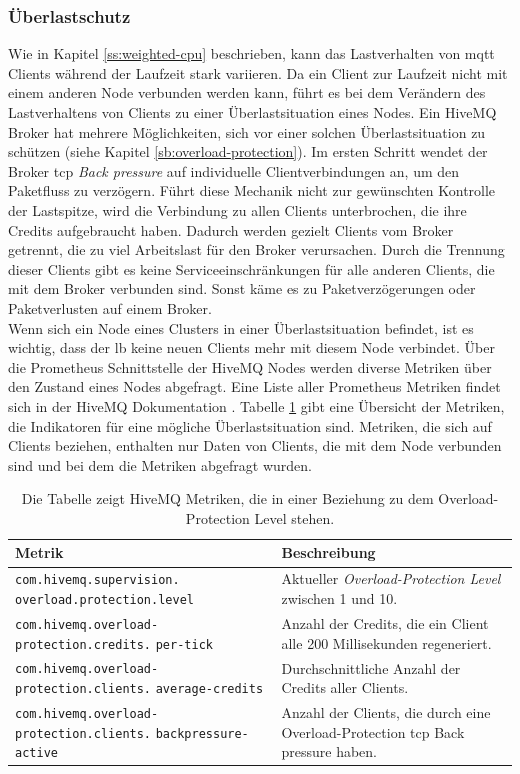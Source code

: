 \newpage
\null
\newpage
\subsubsection{Überlastschutz} \label{ss:circuit-breaking}
Wie in Kapitel \ref{ss:weighted-cpu} beschrieben, kann das Lastverhalten von \ac{mqtt} Clients während der Laufzeit stark variieren.
Da ein Client zur Laufzeit nicht mit einem anderen Node verbunden werden kann, führt es bei dem Verändern des Lastverhaltens von Clients zu einer Überlastsituation eines Nodes.
Ein HiveMQ Broker hat mehrere Möglichkeiten, sich vor einer solchen Überlastsituation zu schützen (siehe Kapitel \ref{sb:overload-protection}).
Im ersten Schritt wendet der Broker \ac{tcp} \textit{Back pressure} auf individuelle Clientverbindungen an, um den Paketfluss zu verzögern.
Führt diese Mechanik nicht zur gewünschten Kontrolle der Lastspitze, wird die Verbindung zu allen Clients unterbrochen, die ihre Credits aufgebraucht haben.
Dadurch werden gezielt Clients vom Broker getrennt, die zu viel Arbeitslast für den Broker verursachen.
Durch die Trennung dieser Clients gibt es keine Serviceeinschränkungen für alle anderen Clients, die mit dem Broker verbunden sind.
Sonst käme es zu Paketverzögerungen oder Paketverlusten auf einem Broker.
\\
Wenn sich ein Node eines Clusters in einer Überlastsituation befindet, ist es wichtig, dass der \acl{lb} keine neuen Clients mehr mit diesem Node verbindet.
Über die Prometheus Schnittstelle der HiveMQ Nodes werden diverse Metriken über den Zustand eines Nodes abgefragt.
Eine Liste aller Prometheus Metriken findet sich in der HiveMQ Dokumentation \cite{MonitoringHiveMQDocumentation}.
Tabelle \ref{table:overload-protection-metrics} gibt eine Übersicht der Metriken, die Indikatoren für eine mögliche Überlastsituation sind. Metriken, die sich auf Clients beziehen, enthalten nur Daten von Clients, die mit dem Node verbunden sind und bei dem die Metriken abgefragt wurden.
\begin{table}[htbp]
\centering
\renewcommand{\arraystretch}{1.5}
\begin{tabularx}{\textwidth}{|p{5cm}|X|}
    \hline
    \textbf{Metrik} & \textbf{Beschreibung} \\
    \hline
    \hline
    \verb|com.hivemq.supervision.| \verb|overload.protection.level| & Aktueller \textit{Overload-Protection Level} zwischen 1 und 10. \\
    \hline
    \verb|com.hivemq.overload-| \verb|protection.credits.| \verb|per-tick| & Anzahl der Credits, die ein Client alle 200 Millisekunden regeneriert. \\
    \hline
    \verb|com.hivemq.overload-| \verb|protection.clients.| \verb|average-credits| & Durchschnittliche Anzahl der Credits aller Clients. \\
    \hline
    \verb|com.hivemq.overload-| \verb|protection.clients.| \verb|backpressure-active| & Anzahl der Clients, die durch eine Overload-Protection \ac{tcp} Back pressure haben. \\
    \hline
\end{tabularx}
\caption{Die Tabelle zeigt HiveMQ Metriken, die in einer Beziehung zu dem Overload-Protection Level stehen.}
\label{table:overload-protection-metrics}
\end{table}

